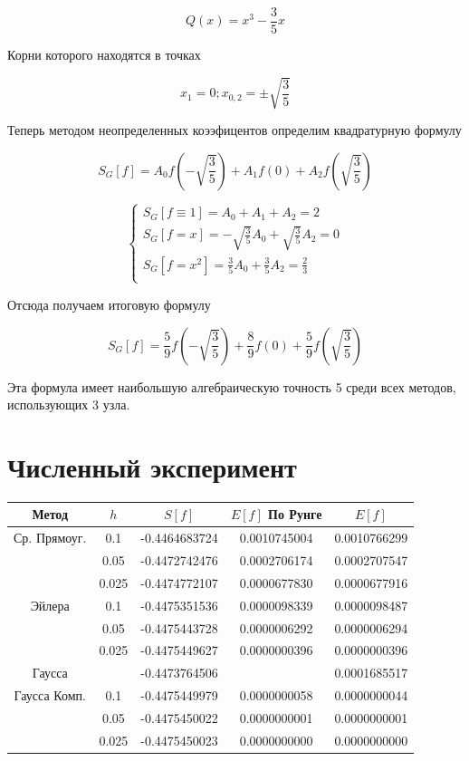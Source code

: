 \documentclass[11pt,a4paper,oneside]{article}
\begin{document}
$$ Q(x) = x^3 - \frac{3}{5} x $$

Корни которого находятся в точках

$$ x_1 = 0; x_{0, 2} = \pm \sqrt{\frac{3}{5}} $$

Теперь методом неопределенных коээфицентов определим квадратурную формулу

$$ S_G[f] = A_0 f \left( -\sqrt{\frac{3}{5}} \right) + A_1 f(0) + A_2 f \left(\sqrt{\frac{3}{5}} \right) $$


$$
\left\{ \begin{array}{l}
	S_G[f \equiv 1] = A_0 + A_1 + A_2 = 2 \\
	S_G[f = x] = -\sqrt{\frac{3}{5}} A_0 + \sqrt{\frac{3}{5}} A_2 = 0 \\
	S_G[f = x^2] = \frac{3}{5} A_0 + \frac{3}{5} A_2 = \frac{2}{3} \\
\end{array} \right.
$$

Отсюда получаем итоговую формулу

$$ S_G[f] = \frac{5}{9} f \left( -\sqrt{\frac{3}{5}} \right) + \frac{8}{9} f(0) + \frac{5}{9} f \left(\sqrt{\frac{3}{5}} \right) $$

Эта формула имеет наибольшую алгебраическую точность 5 среди всех методов, использующих 3 узла.

\section{Численный эксперимент}

\begin{tabular}{| c | c | c | c | c |}
	\hline
	Метод        & $h$   & $S[f]$        & $E[f]$ По Рунге & $E[f]$ \\ \hline \hline
	Ср. Прямоуг. & 0.1   & -0.4464683724 & 0.0010745004    & 0.0010766299 \\ \cline{2-5}
	             & 0.05  & -0.4472742476 & 0.0002706174    & 0.0002707547 \\ \cline{2-5}
                 & 0.025 & -0.4474772107 & 0.0000677830    & 0.0000677916 \\ \hline
    Эйлера       & 0.1   & -0.4475351536 & 0.0000098339    & 0.0000098487 \\ \cline{2-5}
                 & 0.05  & -0.4475443728 & 0.0000006292    & 0.0000006294 \\ \cline{2-5}
                 & 0.025 & -0.4475449627 & 0.0000000396    & 0.0000000396 \\ \hline
    Гаусса       &       & -0.4473764506 &                 & 0.0001685517 \\ \hline
    Гаусса Комп. & 0.1   & -0.4475449979 & 0.0000000058    & 0.0000000044 \\ \cline{2-5}
			     & 0.05  & -0.4475450022 & 0.0000000001    & 0.0000000001 \\ \cline{2-5}
			     & 0.025 & -0.4475450023 & 0.0000000000    & 0.0000000000 \\ \hline
\end{tabular}
\end{document}
